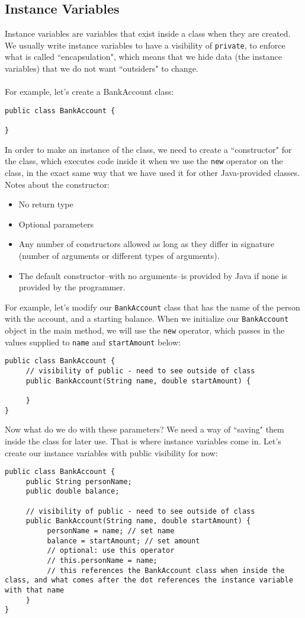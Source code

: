\subsection{Instance Variables}
Instance variables are variables that exist inside a class when they are created. We usually write instance variables to have a visibility of \verb|private|, to enforce what is called ``encapsulation", which means that we hide data (the instance variables) that we do not want ``outsiders" to change. 
\\ \\
For example, let's create a BankAccount class:
\begin{lstlisting}
public class BankAccount {
	
}
\end{lstlisting}
In order to make an instance of the class, we need to create a ``constructor" for the class, which executes code inside it when we use the \verb|new| operator on the class, in the exact same way that we have used it for other Java-provided classes. Notes about the constructor:
\begin{itemize}
\item No return type
\item Optional parameters
\item Any number of constructors allowed as long as they differ in signature (number of arguments or different types of arguments).
\item The default constructor--with no arguments--is provided by Java if none is provided by the programmer.
\end{itemize}
For example, let's modify our \verb|BankAccount| class that has the name of the person with the account, and a starting balance. When we initialize our \verb|BankAccount| object in the main method, we will use the \verb|new| operator, which passes in the values supplied to \verb|name| and \verb|startAmount| below:
\begin{lstlisting}
public class BankAccount {
     // visibility of public - need to see outside of class	
     public BankAccount(String name, double startAmount) {
	
     }
}
\end{lstlisting}
Now what do we do with these parameters? We need a way of ``saving" them inside the class for later use. That is where instance variables come in. Let's create our instance variables with public visibility for now:
\begin{lstlisting}
public class BankAccount {
     public String personName;
     public double balance;
     
     // visibility of public - need to see outside of class	
     public BankAccount(String name, double startAmount) {
          personName = name; // set name
          balance = startAmount; // set amount
          // optional: use this operator
          // this.personName = name;
          // this references the BankAccount class when inside the class, and what comes after the dot references the instance variable with that name
     }
}
\end{lstlisting}
